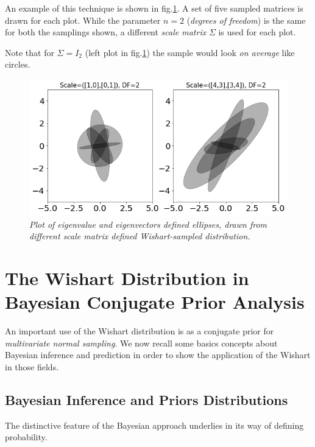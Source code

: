 \documentclass[12pt,openright,twoside,a4paper]{book}
\begin{document}
An example of this technique is shown in fig.\ref{Wish-eig}. A set of five sampled matrices is drawn for each plot. While the parameter $n=2$ (\textit{degrees of freedom}) is the same for both the samplings shown, a different \textit{scale matrix} $\Sigma$ is used for each plot.

Note that for $\Sigma=I_2$ (left plot in fig.\ref{Wish-eig}) the sample would look \textit{on average} like circles.

\begin{figure}[!h]
\centering
\includegraphics[scale=0.37]{wisheig-df2}
\caption{\textit{Plot of eigenvalue and eigenvectors defined ellipses, drawn from different scale matrix defined Wishart-sampled distribution. }}
\label{Wish-eig}
\end{figure}

\section{The Wishart Distribution in Bayesian Conjugate Prior Analysis}

An important use of the Wishart distribution is as a conjugate prior for \textit{multivariate normal sampling}. We now recall some basics concepts about Bayesian inference and prediction in order to show the application of the Wishart in those fields.

\subsection{Bayesian Inference and Priors Distributions}

The distinctive feature of the Bayesian approach underlies in its way of defining probability.
\end{document}
